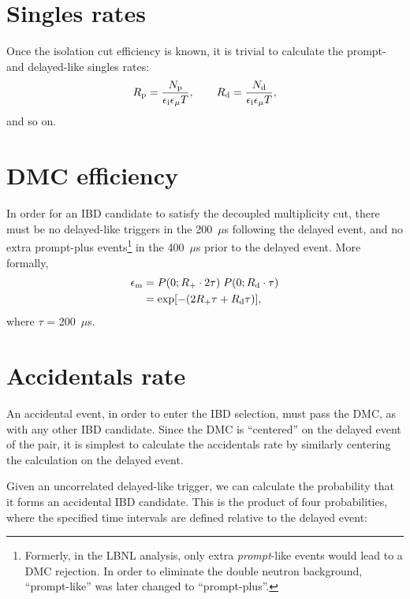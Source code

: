 \documentclass[../thesis.tex]{subfiles}
\begin{document}
\section{Singles rates}
\label{sec:singratescalc}

Once the isolation cut efficiency is known, it is trivial to calculate the prompt- and delayed-like singles rates:
\begin{equation}
  R_\mathrm{p} = \frac{N_\mathrm{p}}{\epsilon_\mathrm{i} \epsilon_\mathrm{\mu} T},\qquad
  R_\mathrm{d} = \frac{N_\mathrm{d}}{\epsilon_\mathrm{i} \epsilon_\mathrm{\mu} T},
\end{equation}
and so on.

\section{DMC efficiency}
\label{sec:dmceffcalc}

\def\edmc{\ensuremath{\epsilon_\mathrm{m}}}

In order for an IBD candidate to satisfy the decoupled multiplicity cut, there must be no delayed-like triggers in the 200~$\mu$s following the delayed event, and no extra prompt-plus events\footnote{Formerly, in the LBNL analysis, only extra \emph{prompt}-like events would lead to a DMC rejection. In order to eliminate the double neutron background, ``prompt-like'' was later changed to ``prompt-plus''.} in the 400~$\mu$s prior to the delayed event. More formally,
\begin{align}
  \edmc &= P(0; \Rplu \cdot 2\tau)\;P(0; \Rdel \cdot \tau) \nonumber \\
        &= \exp [-(2\Rplu\tau + \Rdel\tau)],
\end{align}
where $\tau$ = 200~$\mu$s.

\section{Accidentals rate}
\label{sec:accratecalc}

An accidental event, in order to enter the IBD selection, must pass the DMC, as with any other IBD candidate. Since the DMC is ``centered'' on the delayed event of the pair, it is simplest to calculate the accidentals rate by similarly centering the calculation on the delayed event.

Given an uncorrelated delayed-like trigger, we can calculate the probability that it forms an accidental IBD candidate. This is the product of four probabilities, where the specified time intervals are defined relative to the delayed event:
\end{document}

